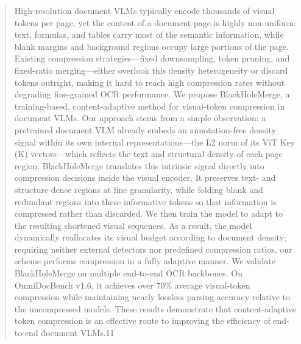 \begin{abstract}
High-resolution document VLMs typically encode thousands of visual tokens per page, yet the content of a document page is highly non-uniform: text, formulas, and tables carry most of the semantic information, while blank margins and background regions occupy large portions of the page. Existing compression strategies---fixed downsampling, token pruning, and fixed-ratio merging---either overlook this density heterogeneity or discard tokens outright, making it hard to reach high compression rates without degrading fine-grained OCR performance. We propose BlackHoleMerge, a training-based, content-adaptive method for visual-token compression in document VLMs. Our approach stems from a simple observation: a pretrained document VLM already embeds an annotation-free density signal within its own internal representations---the L2 norm of its ViT Key (K) vectors---which reflects the text and structural density of each page region. BlackHoleMerge translates this intrinsic signal directly into compression decisions inside the visual encoder. It preserves text- and structure-dense regions at fine granularity, while folding blank and redundant regions into these informative tokens so that information is compressed rather than discarded. We then train the model to adapt to the resulting shortened visual sequences. As a result, the model dynamically reallocates its visual budget according to document density; requiring neither external detectors nor predefined compression ratios, our scheme performs compression in a fully adaptive manner. We validate BlackHoleMerge on multiple end-to-end OCR backbones. On OmniDocBench v1.6, it achieves over 70\% average visual-token compression while maintaining nearly lossless parsing accuracy relative to the uncompressed models. These results demonstrate that content-adaptive token compression is an effective route to improving the efficiency of end-to-end document VLMs.11
\end{abstract}